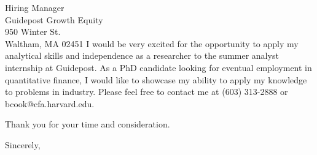 \documentclass{letter}
\begin{document}
\begin{letter}{Hiring Manager\\
   Guidepost Growth Equity\\ 950 Winter St.\\Waltham, MA 02451 }
\noindent I would be very excited for the opportunity to apply my
analytical skills and independence as a researcher to the summer
analyst internship at Guidepost. As a PhD candidate
looking for eventual employment in quantitative finance, I would like
to showcase my ability to apply my knowledge to problems in industry.
Please feel free to contact me at (603) 313-2888 or
bcook@cfa.harvard.edu.

Thank you for your time and consideration.


\closing{Sincerely,}


\end{letter}
\end{document}
